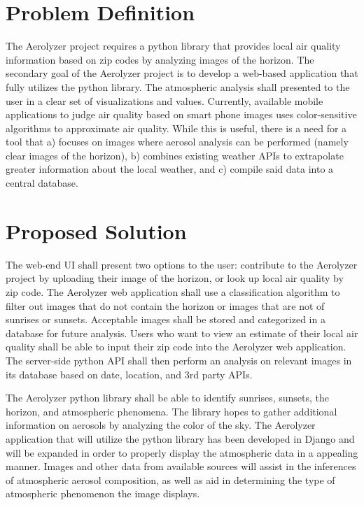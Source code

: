 \documentclass[letterpaper,10pt,draftclsnofoot,onecolumn]{IEEEtran}
\begin{document}
\clearpage
\begin{flushleft}
\section{Problem Definition}
The Aerolyzer project requires a python library that provides local air quality information based on zip codes by analyzing images of the horizon. The secondary goal of the Aerolyzer project is to develop a web-based application that fully utilizes the python library. The atmospheric analysis shall presented to the user in a clear set of visualizations and values. Currently, available mobile applications to judge air quality based on smart phone images uses color-sensitive algorithms to approximate air quality. While this is useful, there is a need for a tool that a) focuses on images where aerosol analysis can be performed (namely clear images of the horizon), b) combines existing weather APIs to extrapolate greater information about the local weather, and c) compile said data into a central database.

\section{Proposed Solution}
The web-end UI shall present two options to the user: contribute to the Aerolyzer project by uploading their image of the horizon, or look up local air quality by zip code. The Aerolyzer web application shall use a classification algorithm to filter out images that do not contain the horizon or images that are not of sunrises or sunsets. Acceptable images shall be stored and categorized in a database for future analysis. Users who want to view an estimate of their local air quality shall be able to input their zip code into the Aerolyzer web application. The server-side python API shall then perform an analysis on relevant images in its database based on date, location, and 3rd party APIs. \par The Aerolyzer python library shall be able to identify sunrises, sunsets, the horizon, and atmospheric phenomena. The library hopes to gather additional information on aerosols by analyzing the color of the sky. The Aerolyzer application that will utilize the python library has been developed in Django and will be expanded in order to properly display the atmospheric data in a appealing manner. Images and other data from available sources will assist in the inferences of atmospheric aerosol composition, as well as aid in determining the type of atmospheric phenomenon the image displays.


\end{flushleft}
\end{document}
